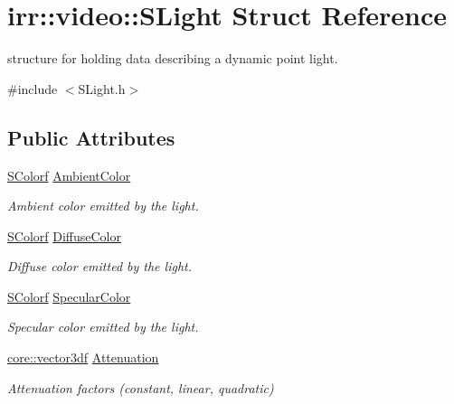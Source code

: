 \hypertarget{structirr_1_1video_1_1SLight}{}\section{irr\+:\+:video\+:\+:S\+Light Struct Reference}
\label{structirr_1_1video_1_1SLight}


structure for holding data describing a dynamic point light.  




{\ttfamily \#include $<$S\+Light.\+h$>$}

\subsection*{Public Attributes}
\begin{DoxyCompactItemize}
\item 
\mbox{\label{structirr_1_1video_1_1SLight_a120e9234a2141eb1fbe46cad23794e0e}} 
\hyperlink{classirr_1_1video_1_1SColorf}{S\+Colorf} \hyperlink{structirr_1_1video_1_1SLight_a120e9234a2141eb1fbe46cad23794e0e}{Ambient\+Color}
\begin{DoxyCompactList}\small\item\em Ambient color emitted by the light. \end{DoxyCompactList}\item 
\hyperlink{classirr_1_1video_1_1SColorf}{S\+Colorf} \hyperlink{structirr_1_1video_1_1SLight_a226622e93aa1e249fe876fdb9d0186fe}{Diffuse\+Color}
\begin{DoxyCompactList}\small\item\em Diffuse color emitted by the light. \end{DoxyCompactList}\item 
\hyperlink{classirr_1_1video_1_1SColorf}{S\+Colorf} \hyperlink{structirr_1_1video_1_1SLight_a2d66ad28850a8588b2ba727103710604}{Specular\+Color}
\begin{DoxyCompactList}\small\item\em Specular color emitted by the light. \end{DoxyCompactList}\item 
\hyperlink{namespaceirr_1_1core_ae6e2b2a6c552833ebbd5b7463d03586b}{core\+::vector3df} \hyperlink{structirr_1_1video_1_1SLight_a06c10ab01b8ad1ee554b956bd5baeacc}{Attenuation}
\begin{DoxyCompactList}\small\item\em Attenuation factors (constant, linear, quadratic) \end{DoxyCompactList}\item 

\end{DoxyCompactItemize}
